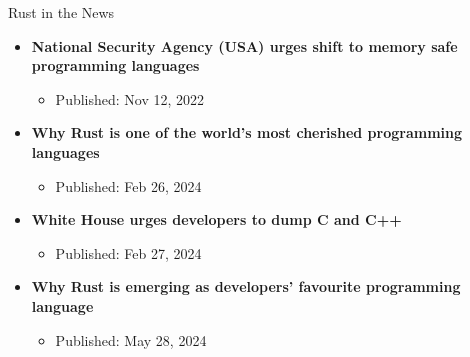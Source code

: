 \documentclass[10pt]{beamer}
\begin{document}
\begin{frame}{Rust in the News}
    \begin{itemize}
        \item \textbf{National Security Agency (USA) urges shift to memory safe programming languages}
        \begin{itemize}
            \item Published: Nov 12, 2022
        \end{itemize}
        \item \textbf{Why Rust is one of the world's most cherished programming languages}
        \begin{itemize}
            \item Published: Feb 26, 2024
        \end{itemize}
        \item \textbf{White House urges developers to dump C and C++}
        \begin{itemize}
            \item Published: Feb 27, 2024
        \end{itemize}
        \item \textbf{Why Rust is emerging as developers’ favourite programming language}
        \begin{itemize}
            \item Published: May 28, 2024
        \end{itemize}
    \end{itemize}    
\end{frame}
\end{document}
